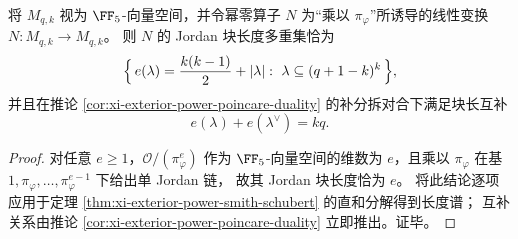 \begin{corollary}\label{cor:xi-exterior-power-jordan-schubert}
将 \(M_{q,k}\) 视为 \(\FF_5\)-向量空间，并令幂零算子 \(N\) 为“乘以 \(\pi_\varphi\)”所诱导的线性变换
\(
N:M_{q,k}\to M_{q,k}
\)。
则 \(N\) 的 Jordan 块长度多重集恰为
\[
\Bigl\{\,e(\lambda)=\frac{k(k-1)}{2}+|\lambda|:\ \lambda\subseteq (q+1-k)^k\,\Bigr\},
\]
并且在推论 \ref{cor:xi-exterior-power-poincare-duality} 的补分拆对合下满足块长互补
\[
e(\lambda)+e(\lambda^\vee)=kq.
\]
\end{corollary}
\begin{proof}
对任意 \(e\ge 1\)，\(\mathcal O/(\pi_\varphi^{e})\) 作为 \(\FF_5\)-向量空间的维数为 \(e\)，且乘以 \(\pi_\varphi\) 在基 \(1,\pi_\varphi,\dots,\pi_\varphi^{e-1}\) 下给出单 Jordan 链，
故其 Jordan 块长度恰为 \(e\)。
将此结论逐项应用于定理 \ref{thm:xi-exterior-power-smith-schubert} 的直和分解得到长度谱；
互补关系由推论 \ref{cor:xi-exterior-power-poincare-duality} 立即推出。证毕。
\end{proof}

\endinput

